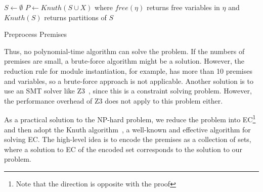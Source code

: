 \begin{algorithm}[t]
\DontPrintSemicolon
{}
$S \gets \emptyset$\;
$P \gets \mathit{Knuth}(S \cup X)$\;
where $\mathit{free}(\eta)$ returns free variables in $\eta$ and
$\mathit{Knuth}(S)$ returns partitions of $S$
\caption{Preprocess Premises}
\label{algo:preminfer}
\end{algorithm}

\medskip
Thus, no polynomial-time algorithm can solve the problem.
If the numbers of premises are small, a brute-force algorithm might be a solution.
However, the reduction rule for module instantiation, for example,
has more than 10 premises and variables, so a brute-force approach is not applicable.
Another solution is to use an SMT solver like Z3~\cite{z3},
since this is a constraint solving problem.
However, the performance overhead of Z3 does not apply to this problem either.

As a practical solution to the NP-hard problem,
we reduce the problem into EC\footnote{Note that the direction is opposite with
the proof} and then adopt the Knuth algorithm~\cite{knuth2000dancing},
a well-known and effective algorithm for solving EC.
The high-level idea is to encode the premises as a collection of sets,
where a solution to EC of the encoded set corresponds to the solution to our problem.

